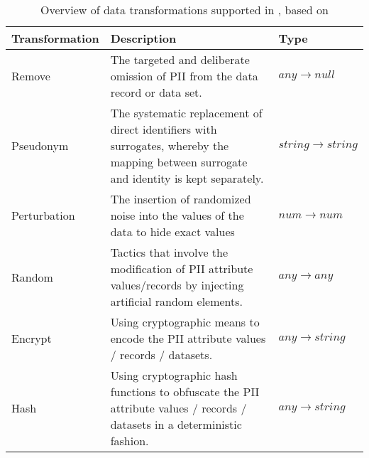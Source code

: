 \begin{table}[h]
\begin{tabulary}{\textwidth}{p{0.20\textwidth}p{0.52\textwidth}p{0.2\textwidth}}
\textbf{Transformation} & \textbf{Description}  & \textbf{Type}               \\ \hline
Remove                       & The targeted and deliberate omission of \gls{PII} from the data record or data set.                                                            & $any \rightarrow null$      \\
Pseudonym                    & The systematic replacement of direct identifiers with surrogates, whereby the mapping between surrogate and identity is kept separately. & $string \rightarrow string$ \\
Perturbation                 & The insertion of randomized noise into the values of the data to hide exact values                                                       & $num \rightarrow num$ \\
Random                       & Tactics that involve the modification of \gls{PII} attribute values/records by injecting artificial random elements.                           & $any \rightarrow any$       \\
Encrypt                      & Using cryptographic means to encode the \gls{PII} attribute values / records / datasets.                                                       & $any \rightarrow string$    \\
Hash                         & Using cryptographic hash functions to obfuscate the \gls{PII} attribute values / records / datasets in a deterministic fashion.                & $any \rightarrow string$   
\end{tabulary}
\caption{Overview of data transformations supported in \middleware{}, based on \citet{de-id-taxonomy}}
\label{table:supported-transformations}
\end{table}
